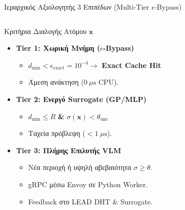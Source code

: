 \begin{frame}{Ιεραρχικός Αξιολογητής 3 Επιπέδων (Multi-Tier $\epsilon$-Bypass)}
  \begin{columns}[c]
    \begin{column}{0.54\textwidth}
      \begin{block}{Κριτήρια Διαλογής Ατόμου $\mathbf{x}$}
        \begin{itemize}
          \item \textbf{Tier 1: Χωρική Μνήμη ($\epsilon$-Bypass)}
          \begin{itemize}
            \item $d_{\min} < \epsilon_{\text{exact}} = 10^{-4} \to$ \textbf{Exact Cache Hit}
            \item Άμεση ανάκτηση ($0\ \mu\text{s}$ CPU).
          \end{itemize}
          \vspace{0.05cm}
          \item \textbf{Tier 2: Ενεργό Surrogate (GP/MLP)}
          \begin{itemize}
            \item $d_{\min} \le R$ \textbf{\&} $\sigma(\mathbf{x}) < \theta_{\text{unc}}$
            \item Ταχεία πρόβλεψη ($<1\ \mu\text{s}$).
          \end{itemize}
          \vspace{0.05cm}
          \item \textbf{Tier 3: Πλήρης Επιλυτής VLM}
          \begin{itemize}
            \item Νέα περιοχή ή υψηλή αβεβαιότητα $\sigma \ge \theta$.
            \item gRPC μέσω Envoy σε Python Worker.
            \item Feedback στο LEAD DHT \& Surrogate.
          \end{itemize}
        \end{itemize}
      \end{block}
    \end{column}

    \begin{column}{0.44\textwidth}
      \centering
      \begin{tikzpicture}[node distance=0.65cm, auto,
        block/.style={rectangle, draw=ceidblue, fill=softgray, text width=2.4cm, text centered, rounded corners, minimum height=0.52cm, font=\scriptsize},
        decision/.style={diamond, draw=accentblue, fill=accentblue!10, text width=1.8cm, text centered, inner sep=0pt, font=\tiny},
        line/.style={draw=ceidblue, -stealth', thick}]
        

\end{tikzpicture}
\end{column}
\end{columns}
\end{frame}
